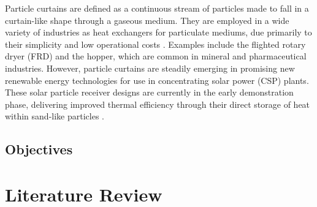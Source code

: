 \documentclass[12pt]{article}
\newcommand{\ts}{\textsuperscript}
\newcommand{\pe}{\vspace{0.3cm}}
\begin{document}
\pe 

Particle curtains are defined as a continuous stream of particles made to fall in a curtain-like
shape through a gaseous medium. They are employed in a wide variety of industries as heat
exchangers for particulate mediums, due primarily to their simplicity and low operational costs \ts{\cite{AfsharCurtainPhd, AndrewLeePhd}}. Examples include the flighted rotary dryer (FRD) and the hopper, which are common in mineral and pharmaceutical industries. However, particle curtains are steadily emerging in promising new renewable energy technologies for use in concentrating solar power (CSP) plants. These solar particle receiver designs are currently in the early demonstration phase, delivering improved thermal efficiency through their direct storage of heat within sand-like particles \ts{\cite{christian2015system, viebahn2011potential}}.





 


\subsection{Objectives}

















\section{Literature Review}














\end{document}
